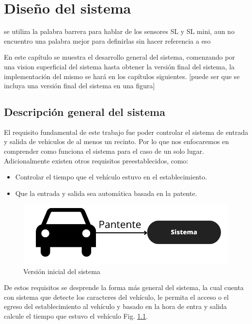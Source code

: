 \chapter{Diseño del sistema}

 {\huge se utiliza la palabra barrera para hablar de los sensores SL y SL mini, aun no encuentro una palabra mejor para definirlas sin hacer referencia a eso}

En este capítulo se muestra el desarrollo general del sistema, comenzando por una vision superficial del sistema hasta obtener la versión final del sistema, la implementación del mismo se hará en los capítulos siguientes. [puede ser que se incluya una versión final del sistema en una figura]
\section{Descripción general del sistema}

El requisito fundamental de este trabajo fue poder controlar el sistema de entrada y salida de vehiculos de al menos un recinto. Por lo que nos enfocaremos en comprender como funciona el sistema para el caso de un solo lugar. Adicionalmente existen otros requisitos preestablecidos, como:

\begin{itemize}
    \item Controlar el tiempo que el vehículo estuvo en el establecimiento.
    \item Que la entrada y salida sea automática basada en la patente.
\end{itemize}


\begin{figure}
    \centering
    \includegraphics[width=.8\textwidth]{imgs/sistema-base.png}
    \caption{Versión inicial del sistema}
    \label{fig:sistema-base}
\end{figure}

De estos requisitos se desprende la forma más general del sistema, la cual cuenta con sistema que detecte los caracteres del vehículo, le permita el acceso o el egreso del establecimiento al vehículo y basado en la hora de entra y salida calcule el tiempo que estuvo el vehículo Fig. \ref{fig:sistema-base}.


